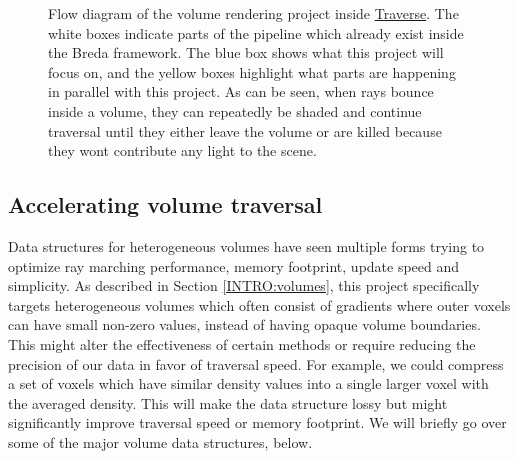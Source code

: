 \begin{figure}[H]
    \centering
    \caption{Flow diagram of the volume rendering project inside \href{https://traverseresearch.nl/}{Traverse}. The white boxes indicate parts of the pipeline which already exist inside the Breda framework. The blue box shows what this project will focus on, and the yellow boxes highlight what parts are happening in parallel with this project. As can be seen, when rays bounce inside a volume, they can repeatedly be shaded and continue traversal until they either leave the volume or are killed because they wont contribute any light to the scene.}
    \label{fig:project_structure}
\end{figure}

\subsection{Accelerating volume traversal} \label{INTRO:volume_acceleration}
Data structures for heterogeneous volumes have seen multiple forms trying to optimize ray marching performance, memory footprint, update speed and simplicity. As described in Section \ref{INTRO:volumes}, this project specifically targets heterogeneous volumes which often consist of gradients where outer voxels can have small non-zero values, instead of having opaque volume boundaries. This might alter the effectiveness of certain methods or require reducing the precision of our data in favor of traversal speed. For example, we could compress a set of voxels which have similar density values into a single larger voxel with the averaged density. This will make the data structure lossy but might significantly improve traversal speed or memory footprint. We will briefly go over some of the major volume data structures, below. 

